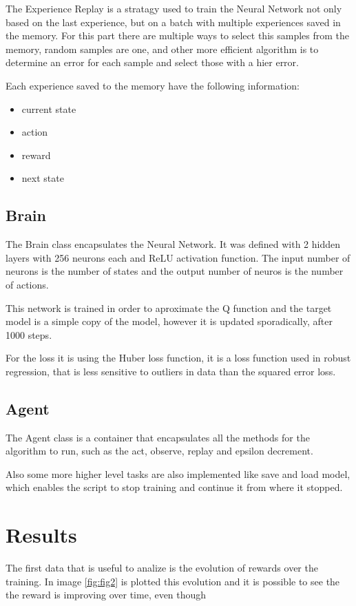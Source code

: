 \documentclass{article}
\begin{document}
The Experience Replay is a stratagy used to train the Neural Network not only based on the last experience, but on a batch with multiple experiences saved in the memory. For this part there are multiple ways to select this samples from the memory, random samples are one, and other more efficient algorithm is to determine an error for each sample and select those with a hier error.

Each experience saved to the memory have the following information:

\begin{itemize}
	\item current state
	\item action
	\item reward
	\item next state
\end{itemize}

\subsection{Brain}
The Brain class encapsulates the Neural Network. It was defined with 2 hidden layers with 256 neurons each and ReLU activation function. The input number of neurons is the number of states and the output number of neuros is the number of actions.

This network is trained in order to aproximate the Q function and the target model is a simple copy of the model, however it is updated sporadically, after 1000 steps.

For the loss it is using the Huber loss function, it is a loss function used in robust regression, that is less sensitive to outliers in data than the squared error loss.

\subsection{Agent}
The Agent class is a container that encapsulates all the methods for the algorithm to run, such as the act, observe, replay and epsilon decrement.

Also some more higher level tasks are also implemented like save and load model, which enables the script to stop training and continue it from where it stopped.

\section{Results}
The first data that is useful to analize is the evolution of rewards over the training. In image \ref{fig:fig2} is plotted this evolution and it is possible to see the the reward is improving over time, even though
\end{document}

